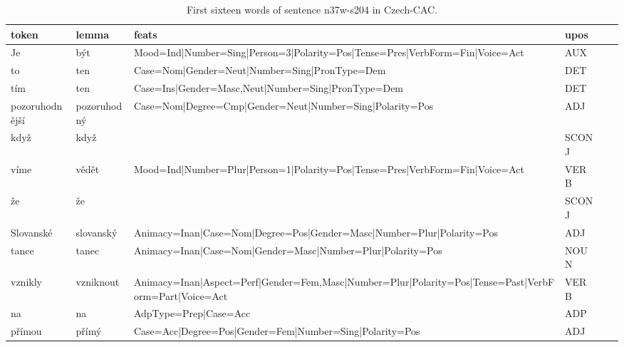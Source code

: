 \documentclass[USenglish]{article}
\begin{document}
\begin{table}[ht]
    \centering
    \caption{First sixteen words of sentence n37w-s204 in Czech-CAC.} %
    \label{tab:example_czech_ADJs}  
    {\small
    \begin{tabular}{p{1.7cm}p{1.5cm}p{5.5cm}p{1.2cm}p{3cm}p{1cm}}
\toprule

	\textbf{token}	&	\textbf{lemma}	&	\textbf{feats}	&	\textbf{upos}		\\	\midrule
Je	&	být	&	Mood=Ind|Number=Sing|Person=3|\newline{}Polarity=Pos|Tense=Pres|VerbForm=Fin|\newline{}Voice=Act	&	AUX	\\ \midrule
to	&	ten	&	Case=Nom|Gender=Neut|\newline{}Number=Sing|PronType=Dem	&	DET	\\ \midrule
tím	&	ten	&	Case=Ins|Gender=Masc,Neut|\newline{}Number=Sing|PronType=Dem	&	DET	\\ \midrule
pozoruhodnější	&	pozoruhodný	&	Case=Nom|Degree=Cmp|Gender=Neut|\newline{}Number=Sing|Polarity=Pos	&	ADJ	\\ \midrule
když	&	když	&		&	SCONJ	\\ \midrule
víme	&	vědět	&	Mood=Ind|Number=Plur|Person=1|\newline{}Polarity=Pos|Tense=Pres|VerbForm=Fin|\newline{}Voice=Act	&	VERB	\\ \midrule
že	&	že	&		&	SCONJ	\\ \midrule
Slovanské	&	slovanský	&	Animacy=Inan|Case=Nom|Degree=Pos|\newline{}Gender=Masc|Number=Plur|Polarity=Pos	&	ADJ	\\ \midrule
tance	&	tanec	&	Animacy=Inan|Case=Nom|\newline{}Gender=Masc|Number=Plur|Polarity=Pos	&	NOUN	\\ \midrule
vznikly	&	vzniknout	&	Animacy=Inan|Aspect=Perf|\newline{}Gender=Fem,Masc|Number=Plur|Polarity=Pos|\newline{}Tense=Past|VerbForm=Part|Voice=Act	&	VERB	\\ \midrule
na	&	na	&	AdpType=Prep|Case=Acc	&	ADP	\\ \midrule
přímou	&	přímý	&	Case=Acc|Degree=Pos|Gender=Fem|\newline{}Number=Sing|Polarity=Pos	&	ADJ	\\ \midrule

\end{tabular}}
\end{table}
\end{document}
